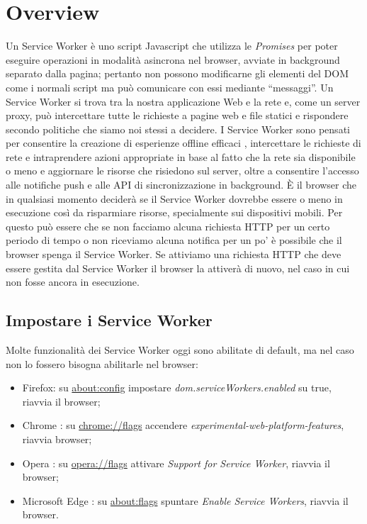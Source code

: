 \documentclass[11pt ,a4paper , twoside , openright ]{book}
\begin{document}
	\section{Overview}
	Un Service Worker \cite{rif23} \cite{rif24} \cite{rif25} è uno script Javascript che utilizza le \textit{Promises} \cite{rif27} per poter eseguire operazioni in modalità asincrona nel browser, avviate in background separato dalla pagina; pertanto non possono modificarne gli elementi del DOM come i normali script ma può comunicare con essi mediante “messaggi”.
	Un Service Worker si trova tra la nostra applicazione Web e la rete e, come un server proxy, può intercettare tutte le richieste a pagine web e file statici e rispondere secondo politiche che siamo noi stessi a decidere.
	I Service Worker sono pensati per consentire la creazione di esperienze offline efficaci \cite{rif28}, intercettare le richieste di rete e intraprendere azioni appropriate in base al fatto che la rete sia disponibile o meno e aggiornare le risorse che risiedono sul server, oltre a consentire l'accesso alle notifiche push e alle API di sincronizzazione in background.
	È il browser che in qualsiasi momento deciderà se il Service Worker dovrebbe essere o meno in esecuzione così da risparmiare risorse, specialmente sui dispositivi mobili. Per questo può essere che se non facciamo alcuna richiesta HTTP per un certo periodo di tempo o non riceviamo alcuna notifica per un po' è possibile che il browser spenga il Service Worker. Se attiviamo una richiesta HTTP che deve essere gestita dal Service Worker il browser la attiverà di nuovo, nel caso in cui non fosse ancora in esecuzione. 
	
	\subsection[Impostare i Service Worker]{Impostare i Service Worker \cite{rif22}}
	Molte funzionalità dei Service Worker oggi sono abilitate di default, ma nel caso non lo fossero bisogna abilitarle nel browser:
	\begin{itemize}
		\item Firefox: su \url{about:config} impostare \textit{dom.serviceWorkers.enabled} su true, riavvia il browser;
		\item Chrome : su \url{chrome://flags} accendere  \textit{experimental-web-platform-features}, riavvia browser;
		\item Opera : su \url{opera://flags} attivare \textit{Support for Service Worker}, riavvia il browser;
		\item Microsoft Edge : su \url{about:flags} spuntare  \textit{Enable Service Workers}, riavvia il browser.
	\end{itemize}
	
\end{document}

